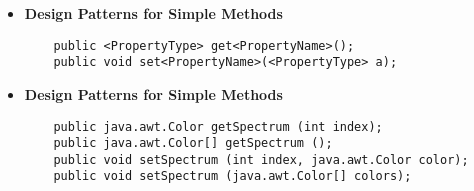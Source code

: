 \begin{enumerate}
\begin{itemize}
        \item \textbf{Design Patterns for Simple Methods}
        \begin{lstlisting}
    public <PropertyType> get<PropertyName>();
    public void set<PropertyName>(<PropertyType> a);
        \end{lstlisting}
        \item \textbf{Design Patterns for Simple Methods}
        \begin{lstlisting}
    public java.awt.Color getSpectrum (int index);
    public java.awt.Color[] getSpectrum ();
    public void setSpectrum (int index, java.awt.Color color);
    public void setSpectrum (java.awt.Color[] colors);
        \end{lstlisting}
    \end{itemize}
    
\end{enumerate}
